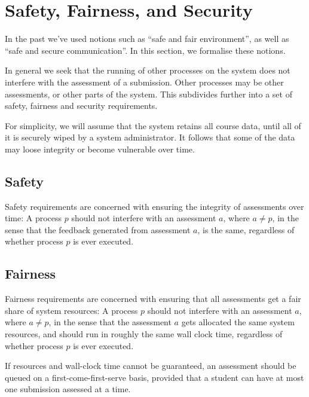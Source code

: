 
\section{Safety, Fairness, and Security}

In the past we've used notions such as ``safe and fair environment'', as well
as ``safe and secure communication''. In this section, we formalise these
notions.

In general we seek that the running of other processes on the system does not
interfere with the assessment of a submission. Other processes may be other
assessments, or other parts of the system. This subdivides further into a set
of safety, fairness and security requirements.

For simplicity, we will assume that the system retains all course data, until
all of it is securely wiped by a system administrator. It follows that some of
the data may loose integrity or become vulnerable over time.



\subsection{Safety}

Safety requirements are concerned with ensuring the integrity of assessments
over time: A process $p$ should not interfere with an assessment $a$, where
$a\neq p$, in the sense that the feedback generated from assessment $a$, is the
same, regardless of whether process $p$ is ever executed.

\subsection{Fairness}

Fairness requirements are concerned with ensuring that all assessments get a
fair share of system resources: A process $p$ should not interfere with an
assessment $a$, where $a\neq p$, in the sense that the assessment $a$ gets
allocated the same system resources, and should run in roughly the same wall
clock time, regardless of whether process $p$ is ever executed.

If resources and wall-clock time cannot be guaranteed, an assessment should be
queued on a first-come-first-serve basis, provided that a student can have at
most one submission assessed at a time.


